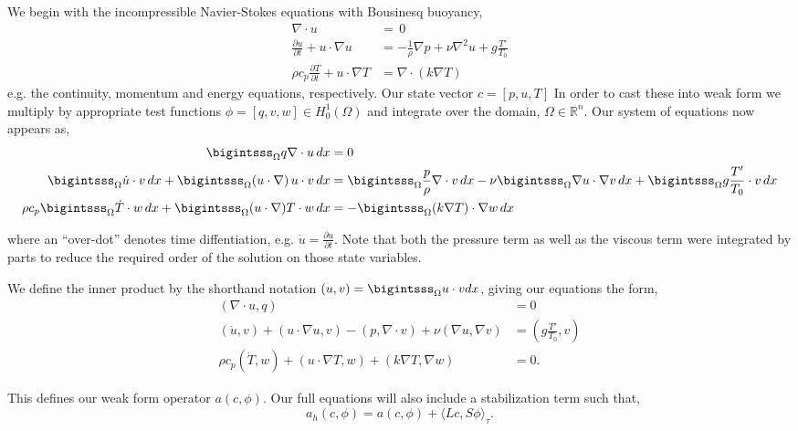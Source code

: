 \documentclass{article}
\begin{document}
We begin with the incompressible Navier-Stokes equations with Bousinesq
buoyancy,
\begin{align}
 \nabla \cdot u &= \, 0 \label{eq_cont}\\
 \frac{\partial u}{\partial t} + u \cdot \nabla u &= -\frac{1}{\rho}
 \nabla p + \nu \nabla^2 u + g \frac{T'}{T_0} \label{eq_mom}\\
 \rho c_p \frac{\partial T}{\partial t} + u \cdot \nabla T &= \nabla
 \cdot (k \nabla T) \label{eq_energy}
\end{align}
e.g. the continuity, momentum and energy equations, respectively. Our 
state vector $c =  \left[p,u,T \right]$ In order to cast these into weak
form we multiply by appropriate test 
functions $\phi = \left[q,v,w \right] \in H^1_0(\Omega)$ and integrate over
the domain, $\Omega \in \mathbb{R}^n$. Our system of equations now
appears as, 
\begin{align}
  \bigintsss_\Omega q \nabla \cdot u \, dx &= 0 \\
 \bigintsss_\Omega \dot u \cdot v \, dx +
 \bigintsss_\Omega  (u \cdot \nabla) \, u \cdot v \, dx &=
 \bigintsss_\Omega \frac{p}{\rho} \nabla \cdot v \, dx - \nu \bigintsss_\Omega \nabla u \cdot \nabla v
 \,dx + \bigintsss_\Omega g \frac{T'}{T_0} \cdot v \, dx \\ 
 \rho c_p \bigintsss_\Omega \dot T \cdot w \, dx + \bigintsss_\Omega (u
 \cdot \nabla) T \cdot w \, dx  &= -\bigintsss_\Omega (k \nabla T) \cdot
 \nabla w \, dx
\end{align}

where an ``over-dot'' denotes time diffentiation, e.g. $\dot u =
\frac{\partial u}{\partial t}$. Note that both the pressure term as well
as the viscous term were integrated by parts to reduce the required
order of the solution on those state variables.  

We define the inner product by the shorthand notation $(u,v) =
\bigintsss_\Omega u\cdot v dx $, giving our equations the form,  
\begin{align}
 (\nabla \cdot u, q) &= 0 \\
 (\dot u,v) + (u \cdot \nabla u, v) - (p,\nabla \cdot v) + \nu (\nabla
 u, \nabla v) &= (g \frac{T'}{T_0},v) \\
 \rho c_p (\dot T,w) + (u \cdot \nabla T,w) + (k \nabla T,\nabla w) &= 0.
\end{align}

This defines our weak form operator $a(c,\phi)$. Our full equations will
also include a stabilization term such that,  
\begin{equation}
 a_h(c,\phi) = a(c,\phi) +  \langle Lc,S\phi \rangle_\tau. 
\end{equation}
\end{document}
